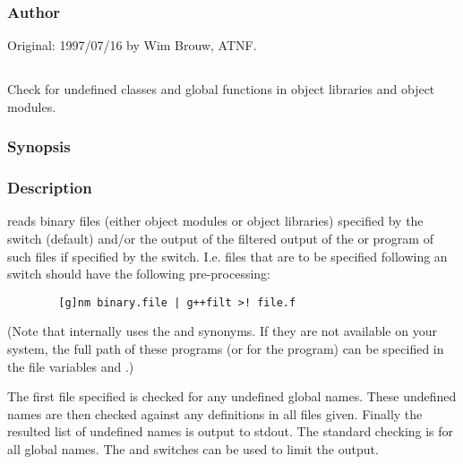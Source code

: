 \subsubsection*{Author}

Original: 1997/07/16 by Wim Brouw, ATNF.


\newpage
\subsection{}
\label{used}

Check for undefined classes and global functions in object libraries and
object modules.

\subsubsection*{Synopsis}

\begin{synopsis}
\end{synopsis}

\subsubsection*{Description}

 reads binary files (either object modules or object
libraries) specified by the  switch (default) and/or the output of the
 filtered output of the  or  
program of such files if specified by the  switch. I.e. files that
are to be specified following an  switch should have the following
pre-processing: 
\begin{verbatim}
        [g]nm binary.file | g++filt >! file.f
\end{verbatim}
(Note that internally  uses the  and 
synonyms. If they are not available on your system, the full path of these
programs (or for the  program) can be specified in the 
file variables  and .)

The first file specified is checked for any undefined global names. These
undefined names are then checked against any definitions in all files
given. Finally the resulted list of undefined names is output to stdout.
The standard checking is for all global names. The   and
 switches can be used to limit the output.

